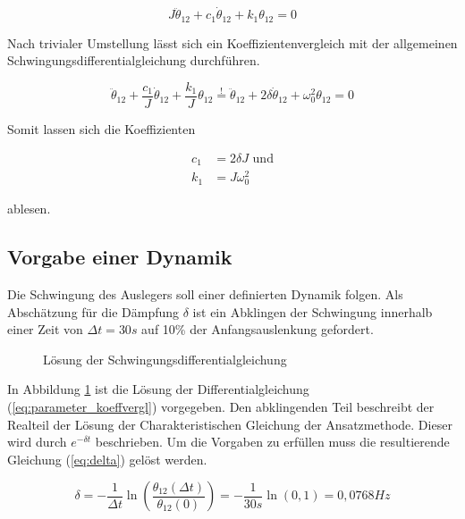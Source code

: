 \begin{equation} \label{eq:parameter_l_DGL}
J\ddot{\theta}_{12}+c_1\dot{\theta}_{12}+k_1\theta_{12}=0
\end{equation}

Nach trivialer Umstellung lässt sich ein Koeffizientenvergleich mit der allgemeinen Schwingungsdifferentialgleichung durchführen.

\begin{equation} \label{eq:parameter_koeffvergl}
\ddot{\theta}_{12}+\dfrac{c_1}{J}\dot{\theta}_{12}+\dfrac{k_1}{J}\theta_{12}\stackrel{!}{=}\ddot{\theta}_{12}+2\delta\dot{\theta}_{12}+\omega_0^2\theta_{12}=0
\end{equation}

Somit lassen sich die Koeffizienten 

\begin{equation} \label{eq:parameter_koeff}
\begin{aligned}
c_1&=2\delta J \mbox{ und}\\
k_1&=J\omega_0^2
\end{aligned}
\end{equation}

ablesen.

\subsection*{Vorgabe einer Dynamik}

Die Schwingung des Auslegers soll einer definierten Dynamik folgen. Als Abschätzung für die Dämpfung $\delta$ ist ein Abklingen der Schwingung innerhalb einer Zeit von $\Delta t=30\si{s}$ auf 10\% der Anfangsauslenkung gefordert.

\begin{figure}[h]
	\centering
	\def\svgscale{0.5}
	
	\caption[Schwingungszeitverlauf]{Lösung der Schwingungsdifferentialgleichung}
	\label{fig:dgl_lsg}
\end{figure}

In Abbildung \ref{fig:dgl_lsg} ist die Lösung der Differentialgleichung (\ref{eq:parameter_koeffvergl}) vorgegeben. Den abklingenden Teil beschreibt der Realteil der Lösung der Charakteristischen Gleichung der Ansatzmethode. Dieser wird durch $e^{-\delta t}$ beschrieben. Um die Vorgaben zu erfüllen muss die resultierende Gleichung (\ref{eq:delta}) gelöst werden.

\begin{equation} \label{eq:delta}
\delta=-\dfrac{1}{\Delta t}\ln\left(\dfrac{\theta_{12}(\Delta t)}{\theta_{12}(0)}\right)=-\dfrac{1}{30\si{s}}\ln(0,1)=0,0768\si{Hz}
\end{equation}
